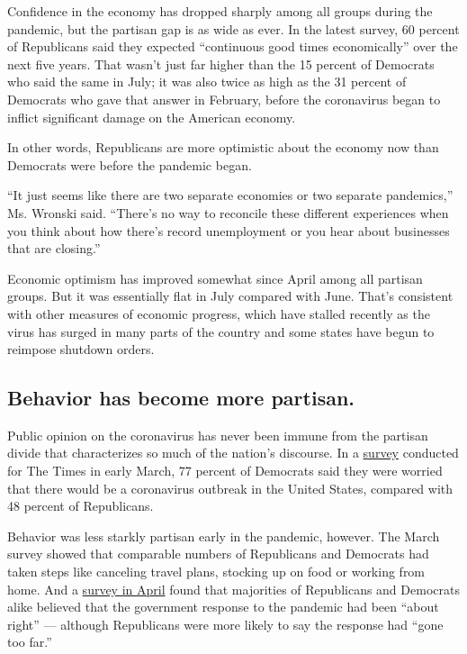 Confidence in the economy has dropped sharply among all groups during
the pandemic, but the partisan gap is as wide as ever. In the latest
survey, 60 percent of Republicans said they expected ``continuous good
times economically'' over the next five years. That wasn't just far
higher than the 15 percent of Democrats who said the same in July; it
was also twice as high as the 31 percent of Democrats who gave that
answer in February, before the coronavirus began to inflict significant
damage on the American economy.

In other words, Republicans are more optimistic about the economy now
than Democrats were before the pandemic began.

``It just seems like there are two separate economies or two separate
pandemics,'' Ms. Wronski said. ``There's no way to reconcile these
different experiences when you think about how there's record
unemployment or you hear about businesses that are closing.''

Economic optimism has improved somewhat since April among all partisan
groups. But it was essentially flat in July compared with June. That's
consistent with other measures of economic progress, which have stalled
recently as the virus has surged in many parts of the country and some
states have begun to reimpose shutdown orders.

\hypertarget{behavior-has-become-more-partisan}{%
\subsection{Behavior has become more
partisan.}\label{behavior-has-become-more-partisan}}

Public opinion on the coronavirus has never been immune from the
partisan divide that characterizes so much of the nation's discourse. In
a
\href{https://www.surveymonkey.com/curiosity/nyt-march-2020-cci/}{survey}
conducted for The Times in early March, 77 percent of Democrats said
they were worried that there would be a coronavirus outbreak in the
United States, compared with 48 percent of Republicans.

Behavior was less starkly partisan early in the pandemic, however. The
March survey showed that comparable numbers of Republicans and Democrats
had taken steps like canceling travel plans, stocking up on food or
working from home. And a
\href{https://www.surveymonkey.com/curiosity/nyt-april-2020-cci/}{survey
in April} found that majorities of Republicans and Democrats alike
believed that the government response to the pandemic had been ``about
right'' --- although Republicans were more likely to say the response
had ``gone too far.''

